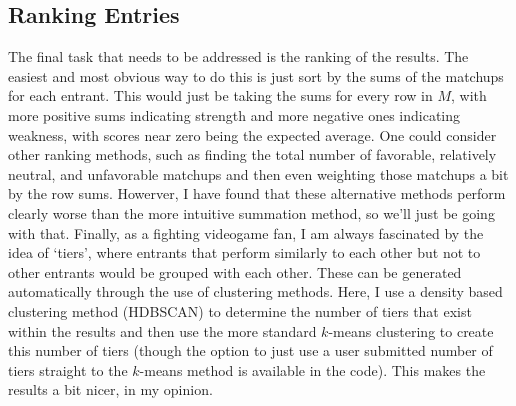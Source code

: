 \documentclass[11pt]{article}
\begin{document}
\subsection{Ranking Entries}
\noindent The final task that needs to be addressed is the ranking of the results. The easiest and most obvious way to do this is just sort by the sums of the matchups for each entrant. This would just be taking the sums for every row in $M$, with more positive sums indicating strength and more negative ones indicating weakness, with scores near zero being the expected average. One could consider other ranking methods, such as finding the total number of favorable, relatively neutral, and unfavorable matchups and then even weighting those matchups a bit by the row sums. Howerver, I have found that these alternative methods perform clearly worse than the more intuitive summation method, so we'll just be going with that. Finally, as a fighting videogame fan, I am always fascinated by the idea of `tiers', where entrants that perform similarly to each other but not to other entrants would be grouped with each other. These can be generated automatically through the use of clustering methods. Here, I use a density based clustering method (HDBSCAN) to determine the number of tiers that exist within the results and then use the more standard $k$-means clustering to create this number of tiers (though the option to just use a user submitted number of tiers straight to the $k$-means method is available in the code). This makes the results a bit nicer, in my opinion. 
\end{document}
